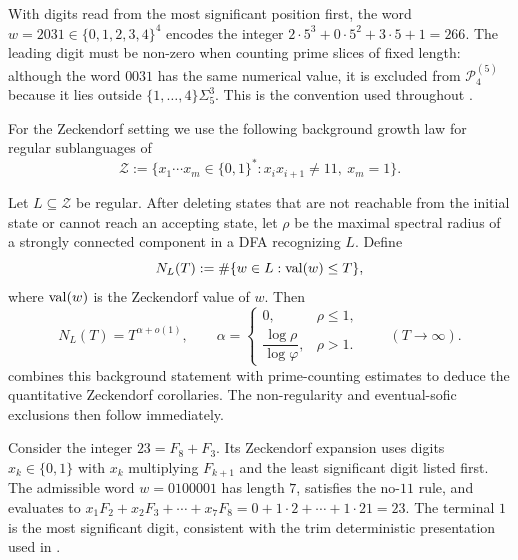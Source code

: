 \begin{example}\label{ex:msd-base}
  With digits read from the most significant position first, the word
  \(w=2031\in\{0,1,2,3,4\}^4\) encodes the integer
  \(2\cdot 5^3+0\cdot 5^2+3\cdot 5+1=266\). The leading digit must be
  non-zero when counting prime slices of fixed length: although the
  word \(0031\) has the same numerical value, it is excluded from
  \(\mathcal P^{(5)}_4\) because it lies outside
  \(\{1,\dots,4\}\Sigma_5^{3}\). This is the convention used throughout
  .
\end{example}

For the Zeckendorf setting we use the following background growth law
for regular sublanguages of
\[
  \mathcal Z
  :=\{x_1\cdots x_m\in\{0,1\}^\ast:
      x_ix_{i+1}\neq 11,\ x_m=1\}.
\]

\begin{theorem}
  \label{thm:intro-zeckendorf}
Let \(L\subseteq\mathcal Z\) be regular. After deleting states that are
not reachable from the initial state or cannot reach an accepting
state, let \(\rho\) be the maximal spectral radius of a strongly
connected component in a DFA recognizing \(L\). Define
\[
  N_L(T):=\#\{w\in L:\operatorname{val}(w)\le T\},
\]
where \(\operatorname{val}(w)\) is the Zeckendorf value of \(w\). Then
\[
  N_L(T)=T^{\alpha+o(1)},
  \qquad
  \alpha=
  \begin{cases}
    0, & \rho\le 1,\\[0.3em]
    \dfrac{\log \rho}{\log \varphi}, & \rho>1.
  \end{cases}
  \qquad (T\to\infty).
\]
 combines this background statement with
prime-counting estimates to deduce the quantitative Zeckendorf
corollaries. The non-regularity and eventual-sofic exclusions then
follow immediately.
\end{theorem}

\begin{example}\label{ex:lsd-zeck}
  Consider the integer \(23=F_8+F_3\). Its Zeckendorf expansion uses
  digits \(x_k\in\{0,1\}\) with \(x_k\) multiplying \(F_{k+1}\) and the
  least significant digit listed first. The admissible word
  \(w=0100001\) has length \(7\), satisfies the no-\(11\) rule, and
  evaluates to
  \(x_1F_2+x_2F_3+\cdots+x_7F_8=0+1\cdot 2+\cdots+1\cdot 21=23\).
  The terminal \(1\) is the most significant digit, consistent with the
  trim deterministic presentation used in .
\end{example}

